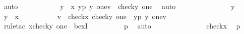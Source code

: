 \begin{isabellebody}
\ auto\ \isanewline
\ \ \ \ \ \ \isamarkupfalse%
\ \isamarkupfalse%
\ {\isachardoublequoteopen}{\isasymexists}\ y\ {\isasymin}\ x{\isachardot}{\kern0pt}\ {\isacharparenleft}{\kern0pt}{\isasymlambda}{\isasymlangle}y{\isacharcomma}{\kern0pt}p{\isasymrangle}{\isachardot}{\kern0pt}\ {\isasymlangle}y{\isacharcomma}{\kern0pt}\ one{\isasymrangle}{\isacharparenright}{\kern0pt}{\isacharparenleft}{\kern0pt}v{\isacharparenright}{\kern0pt}\ {\isacharequal}{\kern0pt}\ {\isacharless}{\kern0pt}check{\isacharparenleft}{\kern0pt}y{\isacharparenright}{\kern0pt}{\isacharcomma}{\kern0pt}\ one{\isachargreater}{\kern0pt}{\isachardoublequoteclose}\ \isamarkupfalse%
\ auto\ \isanewline
\ \ \ \ \isamarkupfalse%
\ \isanewline
\ \ \ \ \ \ \isamarkupfalse%
\ y\ \isamarkupfalse%
\ {\isachardoublequoteopen}y\ {\isasymin}\ x{\isachardoublequoteclose}\ \isanewline
\ \ \ \ \ \ \isamarkupfalse%
\ \isamarkupfalse%
\ {\isachardoublequoteopen}{\isasymexists}v\ {\isasymin}\ check{\isacharparenleft}{\kern0pt}x{\isacharparenright}{\kern0pt}{\isachardot}{\kern0pt}\ {\isasymlangle}check{\isacharparenleft}{\kern0pt}y{\isacharparenright}{\kern0pt}{\isacharcomma}{\kern0pt}\ one{\isasymrangle}\ {\isacharequal}{\kern0pt}\ {\isacharparenleft}{\kern0pt}{\isasymlambda}{\isasymlangle}y{\isacharcomma}{\kern0pt}p{\isasymrangle}{\isachardot}{\kern0pt}\ {\isasymlangle}y{\isacharcomma}{\kern0pt}\ one{\isasymrangle}{\isacharparenright}{\kern0pt}{\isacharparenleft}{\kern0pt}v{\isacharparenright}{\kern0pt}{\isachardoublequoteclose}\isanewline
\ \ \ \ \ \ \ \ \isamarkupfalse%
\ {\isacharparenleft}{\kern0pt}rule{\isacharunderscore}{\kern0pt}tac\ x{\isacharequal}{\kern0pt}{\isachardoublequoteopen}{\isacharless}{\kern0pt}check{\isacharparenleft}{\kern0pt}y{\isacharparenright}{\kern0pt}{\isacharcomma}{\kern0pt}\ one{\isachargreater}{\kern0pt}{\isachardoublequoteclose}\ \ bexI{\isacharparenright}{\kern0pt}\isanewline
\ \ \ \ \ \ \ \ \isamarkupfalse%
\ p{}\ \isamarkupfalse%
\ auto\isanewline
\ \ \ \ \isamarkupfalse%
\isanewline
\ \ \ \ \isamarkupfalse%
\ \isamarkupfalse%
\ {\isachardoublequoteopen}\ {\isachardot}{\kern0pt}{\isachardot}{\kern0pt}{\isachardot}{\kern0pt}\ {\isacharequal}{\kern0pt}\ check{\isacharparenleft}{\kern0pt}x{\isacharparenright}{\kern0pt}{\isachardoublequoteclose}\ \isamarkupfalse%
\ p{}\ \isamarkupfalse%

\end{isabellebody}
